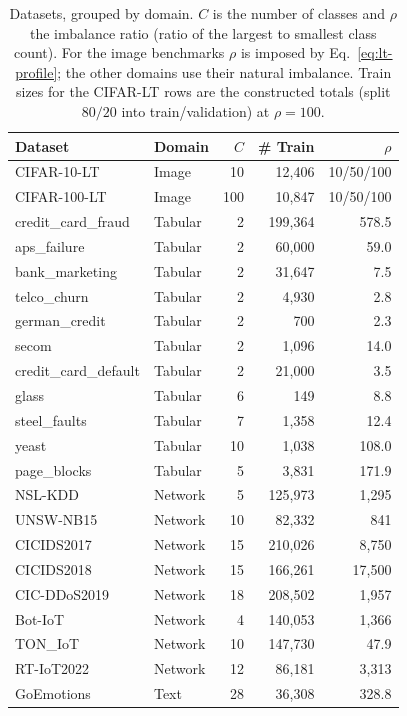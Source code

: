 \documentclass[a4paper,fleqn]{cas-sc}
\begin{document}
\begin{table}[pos=h]
\centering
\caption{Datasets, grouped by domain. $C$ is the number of classes and $\rho$ the
imbalance ratio (ratio of the largest to smallest class count). For the image
benchmarks $\rho$ is imposed by Eq.~\eqref{eq:lt-profile}; the other domains use
their natural imbalance. Train sizes for the CIFAR-LT rows are the constructed
totals (split $80/20$ into train/validation) at $\rho=100$.}
\label{tab:datasets}
\begin{tabular}{llrrr}
\toprule
Dataset & Domain & $C$ & \# Train & $\rho$ \\
\midrule
CIFAR-10-LT          & Image   & 10  & 12{,}406 & 10/50/100 \\
CIFAR-100-LT         & Image   & 100 & 10{,}847 & 10/50/100 \\
\midrule
credit\_card\_fraud   & Tabular & 2   & 199{,}364 & 578.5 \\
aps\_failure          & Tabular & 2   & 60{,}000  & 59.0 \\
bank\_marketing       & Tabular & 2   & 31{,}647  & 7.5 \\
telco\_churn          & Tabular & 2   & 4{,}930   & 2.8 \\
german\_credit        & Tabular & 2   & 700       & 2.3 \\
secom                 & Tabular & 2   & 1{,}096   & 14.0 \\
credit\_card\_default & Tabular & 2   & 21{,}000  & 3.5 \\
glass                 & Tabular & 6   & 149       & 8.8 \\
steel\_faults         & Tabular & 7   & 1{,}358   & 12.4 \\
yeast                 & Tabular & 10  & 1{,}038   & 108.0 \\
page\_blocks          & Tabular & 5   & 3{,}831   & 171.9 \\
\midrule
NSL-KDD               & Network & 5   & 125{,}973 & 1{,}295 \\
UNSW-NB15             & Network & 10  & 82{,}332  & 841 \\
CICIDS2017            & Network & 15  & 210{,}026 & 8{,}750 \\
CICIDS2018            & Network & 15  & 166{,}261 & 17{,}500 \\
CIC-DDoS2019          & Network & 18  & 208{,}502 & 1{,}957 \\
Bot-IoT               & Network & 4   & 140{,}053 & 1{,}366 \\
TON\_IoT              & Network & 10  & 147{,}730 & 47.9 \\
RT-IoT2022            & Network & 12  & 86{,}181  & 3{,}313 \\
\midrule
GoEmotions            & Text    & 28  & 36{,}308  & 328.8 \\
\bottomrule
\end{tabular}
\end{table}
\end{document}
